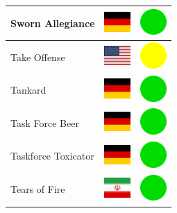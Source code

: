 \documentclass[12pt, a4paper, twoside]{report}
\begin{document}
\begin{center}
\begin{longtable}{|p{5cm}|p{2cm}|p{2cm}|}
 Sworn Allegiance                                           & \includegraphics[width=1cm]{../4x3/de} &   \includegraphics[width=1cm]{../likes/y} \\ \hline
 Take Offense                                               & \includegraphics[width=1cm]{../4x3/us} &   \includegraphics[width=1cm]{../likes/m} \\ \hline
 Tankard                                                    & \includegraphics[width=1cm]{../4x3/de} &   \includegraphics[width=1cm]{../likes/y} \\ \hline
 Task Force Beer                                            & \includegraphics[width=1cm]{../4x3/de} &   \includegraphics[width=1cm]{../likes/y} \\ \hline
 Taskforce Toxicator                                        & \includegraphics[width=1cm]{../4x3/de} &   \includegraphics[width=1cm]{../likes/y} \\ \hline
 Tears of Fire                                              & \includegraphics[width=1cm]{../4x3/ir} &   \includegraphics[width=1cm]{../likes/y} \\ \hline

\end{longtable}
\end{center}
\end{document}
